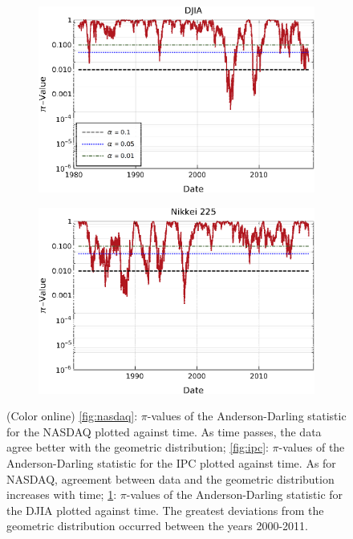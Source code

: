 \documentclass[a4paper]{jpconf}
\begin{document}
\begin{figure}[h!tb]
\begin{subfigure}[b]{0.45\textwidth}
            \includegraphics[width=\textwidth]{img/pvalores_DJIA.eps}
            \caption[]{}      
            \label{fig:dji}
        \end{subfigure}
        \quad
        \begin{subfigure}[b]{0.45\textwidth}   
            \centering 
            \includegraphics[width=\textwidth]{img/pvalores_Nikkei.eps}
            \caption[]{}      
            \label{fig:nikkei}
        \end{subfigure}
        \caption{\small (Color online) \ref{fig:nasdaq}: $\pi$-values of the Anderson-Darling statistic for the NASDAQ plotted against time. As time passes, the data agree better with the geometric distribution; \ref{fig:ipc}: $\pi$-values of the Anderson-Darling statistic for the IPC plotted against time. As for NASDAQ, agreement between data and the geometric distribution increases with time;  \ref{fig:dji}: $\pi$-values of the Anderson-Darling statistic for the DJIA plotted against time. The greatest deviations from the geometric distribution occurred between the years 2000-2011.} 
	\label{fig:PiValuesAD}
\end{figure}
\end{document}
